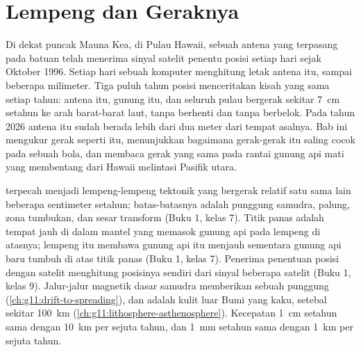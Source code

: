 \chapter{Lempeng dan Geraknya}\label{ch:g11:plate-motions}

Di dekat puncak Mauna Kea, di Pulau Hawaii, sebuah antena yang terpasang pada
batuan telah menerima sinyal satelit penentu posisi setiap hari sejak
Oktober 1996. Setiap hari sebuah komputer menghitung letak antena itu, sampai
beberapa milimeter. Tiga puluh tahun posisi menceritakan kisah yang sama setiap
tahun: antena itu, gunung itu, dan seluruh pulau bergerak sekitar \qty{7}{cm}
setahun ke arah barat-barat laut, tanpa berhenti dan tanpa berbelok. Pada
tahun 2026 antena itu sudah berada lebih dari dua meter dari tempat asalnya. Bab
ini mengukur gerak seperti itu, menunjukkan bagaimana gerak-gerak itu saling
cocok pada sebuah bola, dan membaca gerak yang sama pada rantai gunung api mati
yang membentang dari Hawaii melintasi Pasifik utara.

\begin{recall}
 terpecah menjadi lempeng-lempeng tektonik yang bergerak relatif satu
sama lain beberapa sentimeter setahun; batas-batasnya adalah punggung samudra,
palung, zona tumbukan, dan sesar transform (Buku 1, kelas 7). Titik panas
adalah tempat jauh di dalam mantel yang memasok gunung api pada lempeng di
atasnya; lempeng itu membawa gunung api itu menjauh sementara gunung api baru
tumbuh di atas titik panas (Buku 1, kelas 7). Penerima penentuan posisi dengan
satelit menghitung posisinya sendiri dari sinyal beberapa satelit (Buku 1,
kelas 9). Jalur-jalur magnetik dasar samudra memberikan  sebuah
punggung (\cref{ch:g11:drift-to-spreading}), dan  adalah kulit luar Bumi
yang kaku, setebal sekitar \qty{100}{km}
(\cref{ch:g11:lithosphere-asthenosphere}). Kecepatan \qty{1}{cm} setahun sama
dengan \qty{10}{km} per sejuta tahun, dan \qty{1}{mm} setahun sama dengan
\qty{1}{km} per sejuta tahun.
\end{recall}

